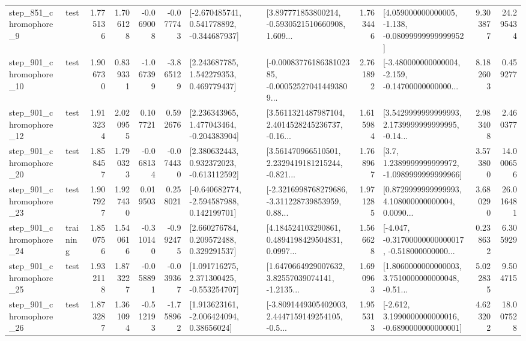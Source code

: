 \begin{tabular}{llrrrrllrlrr}
   step\_851\_chromophore\_9 &      test &      1.775136 &    1.706128 &     -0.069008 & -0.077743 &   [-2.670485741, 0.541778892, -0.344687937] &  [3.897771853800214, -0.5930521510660908, 1.609... &       1.763446 &  [4.059000000000005, -1.138, -0.08099999999999952] &            9.303877 &         24.295434 \\
  step\_901\_chromophore\_10 &      test &      1.906730 &    0.839331 &     -1.067399 & -3.865129 &     [2.243687785, 1.542279353, 0.469779437] &  [-0.0008377618638102385, -0.000525270414493809... &       2.761892 &  [-3.480000000000004, -2.159, -0.14700000000000... &            8.182603 &          0.459277 \\
  step\_901\_chromophore\_12 &      test &      1.913234 &    2.020955 &      0.107721 &  0.592676 &    [2.236343965, 1.477043464, -0.204383904] &  [3.5611321487987104, 2.4014528245236737, -0.16... &       1.615984 &  [3.5429999999999993, 2.1739999999999995, -0.14... &            2.983408 &          2.460377 \\
  step\_901\_chromophore\_20 &      test &      1.858457 &    1.790323 &     -0.068134 & -0.074430 &    [2.380632443, 0.932372023, -0.613112592] &  [3.561470966510501, 2.2329419181215244, -0.821... &       1.768967 &     [3.7, 1.2389999999999972, -1.0989999999999966] &            3.573800 &         14.000656 \\
  step\_901\_chromophore\_23 &      test &      1.907927 &    1.927430 &      0.019503 &  0.258021 &   [-0.640682774, -2.594587988, 0.142199701] &  [-2.3216998768279686, -3.311228739853959, 0.88... &       1.971285 &  [0.8729999999999993, 4.108000000000004, 0.0090... &            3.680290 &         26.016481 \\
  step\_901\_chromophore\_24 &  training &      1.850756 &    1.540616 &     -0.310140 & -0.992475 &     [2.660276784, 0.209572488, 0.329291537] &  [4.184524103290861, 0.4894198429504831, 0.0997... &       1.566628 &  [-4.047, -0.31700000000000017, -0.518000000000... &            0.238632 &          6.305929 \\
  step\_901\_chromophore\_25 &      test &      1.932118 &    1.873227 &     -0.058891 & -0.039367 &    [1.091716275, 2.371300425, -0.553254707] &  [1.6470664929007632, 3.82557039074141, -1.2135... &       1.690963 &  [1.8060000000000003, 3.7510000000000048, -0.51... &            5.022835 &          9.504715 \\
  step\_901\_chromophore\_26 &      test &      1.873287 &    1.361094 &     -0.512193 & -1.758962 &     [1.913623161, -2.006424094, 0.38656024] &  [-3.8091449305402003, 2.4447159149254105, -0.5... &       1.955313 &  [-2.612, 3.1990000000000016, -0.6890000000000001] &            4.623202 &         18.007528 \\

\end{tabular}
